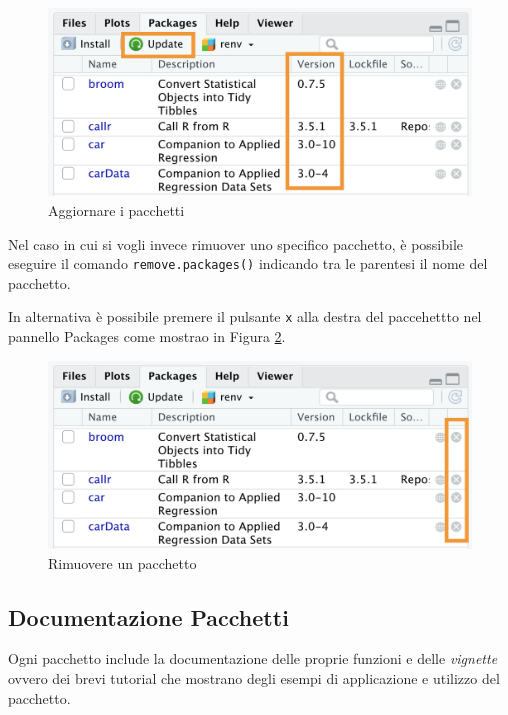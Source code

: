 \documentclass[
]{book}
\begin{document}
\begin{figure}

{\centering \includegraphics[width=0.65\linewidth]{images/library-version} 

}

\caption{Aggiornare i pacchetti}\label{fig:library-version}
\end{figure}

Nel caso in cui si vogli invece rimuover uno specifico pacchetto, è possibile eseguire il comando \texttt{remove.packages()} indicando tra le parentesi il nome del pacchetto.

In alternativa è possibile premere il pulsante \texttt{x} alla destra del paccehettto nel pannello Packages come mostrao in Figura \ref{fig:library-remove}.

\begin{figure}

{\centering \includegraphics[width=0.65\linewidth]{images/library-remove} 

}

\caption{Rimuovere un pacchetto}\label{fig:library-remove}
\end{figure}

\hypertarget{documentazione-pacchetti}{%
\subsection{Documentazione Pacchetti}\label{documentazione-pacchetti}}

Ogni pacchetto include la documentazione delle proprie funzioni e delle \emph{vignette} ovvero dei brevi tutorial che mostrano degli esempi di applicazione e utilizzo del pacchetto.
\end{document}
